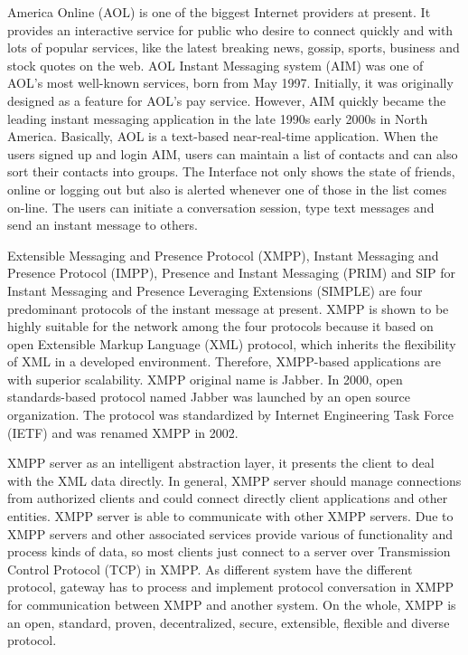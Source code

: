\documentclass[a4paper,11pt]{article}
\begin{document}
America Online (AOL) is one of the biggest Internet providers at present. It provides an interactive service for public who desire to connect quickly and with lots of popular services, like the latest breaking news, gossip, sports, business and stock quotes on the web. AOL Instant Messaging system (AIM) was one of AOL’s most well-known services, born from May 1997. Initially, it was originally designed as a feature for AOL’s pay service. However, AIM quickly became the leading instant messaging application in the late 1990s early 2000s in North America. Basically, AOL is a text-based near-real-time application. When the users signed up and login AIM, users can maintain a list of contacts and can also sort their contacts into groups. The Interface not only shows the state of friends, online or logging out but also is alerted whenever one of those in the list comes on-line. The users can initiate a conversation session, type text messages and send an instant message to others. 

Extensible Messaging and Presence Protocol (XMPP), Instant Messaging and Presence Protocol (IMPP), Presence and Instant Messaging (PRIM) and SIP for Instant Messaging and Presence Leveraging Extensions (SIMPLE) are four predominant protocols of the instant message at present. XMPP is shown to be highly suitable for the network among the four protocols because it based on open Extensible Markup Language (XML) protocol, which inherits the flexibility of XML in a developed environment. Therefore, XMPP-based applications are with superior scalability. XMPP original name is Jabber. In 2000, open standards-based protocol named Jabber was launched by an open source organization. The protocol was standardized by Internet Engineering Task Force (IETF) and was renamed XMPP in 2002. 

XMPP server as an intelligent abstraction layer, it presents the client to deal with the XML data directly. In general, XMPP server should manage connections from authorized clients and could connect directly client applications and other entities. XMPP server is able to communicate with other XMPP servers. Due to XMPP servers and other associated services provide various of functionality and process kinds of data, so most clients just connect to a server over Transmission Control Protocol (TCP) in XMPP. As different system have the different protocol, gateway has to process and implement protocol conversation in XMPP for communication between XMPP and another system. On the whole, XMPP is an open, standard, proven, decentralized, secure, extensible, flexible and diverse protocol.
\end{document}
